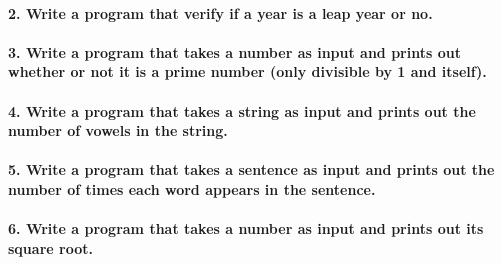 \documentclass[11pt]{article}
\begin{document}
\hypertarget{write-a-program-that-verify-if-a-year-is-a-leap-year-or-no.}{%
\paragraph{2. Write a program that verify if a year is a leap year or
no.}\label{write-a-program-that-verify-if-a-year-is-a-leap-year-or-no.}}

\hypertarget{write-a-program-that-takes-a-number-as-input-and-prints-out-whether-or-not-it-is-a-prime-number-only-divisible-by-1-and-itself.}{%
\paragraph{3. Write a program that takes a number as input and prints
out whether or not it is a prime number (only divisible by 1 and
itself).}\label{write-a-program-that-takes-a-number-as-input-and-prints-out-whether-or-not-it-is-a-prime-number-only-divisible-by-1-and-itself.}}

\hypertarget{write-a-program-that-takes-a-string-as-input-and-prints-out-the-number-of-vowels-in-the-string.}{%
\paragraph{4. Write a program that takes a string as input and prints
out the number of vowels in the
string.}\label{write-a-program-that-takes-a-string-as-input-and-prints-out-the-number-of-vowels-in-the-string.}}

\hypertarget{write-a-program-that-takes-a-sentence-as-input-and-prints-out-the-number-of-times-each-word-appears-in-the-sentence.}{%
\paragraph{5. Write a program that takes a sentence as input and prints
out the number of times each word appears in the
sentence.}\label{write-a-program-that-takes-a-sentence-as-input-and-prints-out-the-number-of-times-each-word-appears-in-the-sentence.}}

\hypertarget{write-a-program-that-takes-a-number-as-input-and-prints-out-its-square-root.}{%
\paragraph{6. Write a program that takes a number as input and prints
out its square
root.}\label{write-a-program-that-takes-a-number-as-input-and-prints-out-its-square-root.}}
\end{document}
